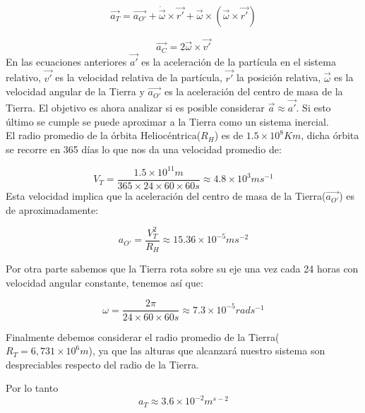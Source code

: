 \documentclass[main]{subfiles}
\begin{document}
\begin{equation}
\vec{a_T}=\vec{a_{O\prime}}+\dot{\vec{\omega}}\times\vec{r\prime}+\vec{\omega}\times (\vec{\omega}\times\vec{r\prime})
\end{equation}

\begin{equation}
\vec{a_C}=2\vec{\omega}\times\vec{v\prime}
\end{equation}
En las ecuaciones anteriores $\vec{a\prime}$ es la aceleraci\'on de la part\'icula en el sistema relativo, $\vec{v\prime}$ es la velocidad relativa de la part\'icula, $\vec{r\prime}$ la posici\'on relativa, $\vec{\omega}$ es la velocidad angular de la Tierra y $\vec{a_{O\prime}}$ es la aceleraci\'on del centro de masa de la Tierra. El objetivo es ahora analizar si es posible considerar $\vec{a}\approx\vec{a\prime}$. Si esto \'ultimo se cumple se puede aproximar a la Tierra como un sistema inercial.\\

El radio promedio de la \'orbita Helioc\'entrica($R_H$) es de $1.5\times10^8Km$, dicha \'orbita se recorre en 365 d\'ias lo que nos da una velocidad promedio de:

\begin{equation}
V_T=\frac{1.5\times10^{11}m}{365\times24\times60\times60s}\approx4.8\times10^3ms^{-1}
\end{equation}
Esta velocidad implica que la aceleraci\'on del centro de masa de la Tierra($\vec{a_{O\prime}}$) es de aproximadamente:

\begin{equation}
a_{O\prime}=\frac{V_T^2}{R_H}\approx15.36\times10^{-5}ms^{-2}
\end{equation}

Por otra parte sabemos que la Tierra rota sobre su eje una vez cada 24 horas con velocidad angular constante, tenemos as\'i que:

\begin{equation}
\omega=\frac{2\pi}{24\times60\times60s}\approx7.3\times10^{-5}rad s^{-1}
\end{equation}

Finalmente debemos considerar el radio promedio de la Tierra($R_T=6,731\times10^{6}m$), ya que las alturas que alcanzar\'a nuestro sistema son despreciables respecto del radio de la Tierra. 

Por lo tanto 
\begin{equation}
a_T \approx 3.6\times10^{-2}m^{s-2}
\end{equation}
\end{document}

